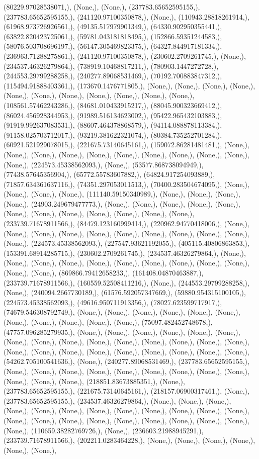 \documentclass{article}
\begin{document}
(80229.97028538071,), (None,), (None,), (237783.65652595155,), (237783.65652595155,), (241120.97100350878,), (None,), (110943.28818261914,), (61968.973726926561,), (49135.517979901349,), (64330.902950355441,), (63822.820423725061,), (59781.043181818495,), (152866.59351244583,), (58076.503708696197,), (56147.305469823375,), (64327.844917181334,), (236963.71288275861,), (241120.97100350878,), (230602.2709261745,), (None,), (234537.46326279864,), (738919.10468817211,), (780903.1447272728,), (244553.29799288258,), (240277.89068531469,), (70192.700883847312,), (115494.91888403361,), (173670.1476771805,), (None,), (None,), (None,), (None,), (None,), (None,), (None,), (None,), (None,), (None,), (None,), (108561.57462243286,), (84681.010433915217,), (88045.900323669412,), (86024.456928344953,), (91989.516134623002,), (95422.965432103883,), (91919.992637083531,), (88607.464378868579,), (94114.088878113384,), (91158.025703712017,), (93219.381622321074,), (80384.735252701284,), (60921.521929078015,), (221675.73140645161,), (159072.86281481481,), (None,), (None,), (None,), (None,), (None,), (None,), (None,), (None,), (None,), (None,), (None,), (224573.45338562093,), (None,), (53577.868738094949,), (77438.57645356904,), (65772.55783607882,), (64824.917254093889,), (71857.634361637116,), (74351.297053011513,), (70400.283504674095,), (None,), (None,), (None,), (None,), (111140.59150340989,), (None,), (None,), (None,), (None,), (24903.249679477773,), (None,), (None,), (None,), (None,), (None,), (None,), (None,), (None,), (None,), (None,), (None,), (None,), (233739.71678911566,), (84479.123160999414,), (220962.94770418006,), (None,), (None,), (None,), (None,), (None,), (None,), (None,), (None,), (None,), (None,), (None,), (224573.45338562093,), (227547.93621192055,), (405115.40806863853,), (153391.68914285715,), (230602.2709261745,), (234537.46326279864,), (None,), (None,), (None,), (None,), (None,), (None,), (None,), (None,), (None,), (None,), (None,), (None,), (869866.79412658233,), (161408.04870463887,), (233739.71678911566,), (160559.52508411216,), (None,), (244553.29799288258,), (None,), (240094.2667730189,), (61576.592057347669,), (59880.954315100105,), (224573.45338562093,), (49616.950711913356,), (78027.623599717917,), (74679.546308792749,), (None,), (None,), (None,), (None,), (None,), (None,), (None,), (None,), (None,), (None,), (None,), (75097.482452748678,), (47757.096285279935,), (None,), (None,), (None,), (None,), (None,), (None,), (None,), (None,), (None,), (None,), (None,), (None,), (None,), (None,), (None,), (None,), (None,), (None,), (None,), (None,), (None,), (None,), (None,), (None,), (54262.705100541636,), (None,), (240277.89068531469,), (237783.65652595155,), (None,), (None,), (None,), (None,), (None,), (None,), (None,), (None,), (None,), (None,), (None,), (None,), (218851.83673885351,), (None,), (237783.65652595155,), (221675.73140645161,), (218157.06900317461,), (None,), (237783.65652595155,), (234537.46326279864,), (None,), (None,), (None,), (None,), (None,), (None,), (None,), (None,), (None,), (None,), (None,), (None,), (None,), (None,), (None,), (None,), (None,), (None,), (None,), (None,), (None,), (None,), (110659.38282769726,), (None,), (236603.21988945291,), (233739.71678911566,), (202211.0283464228,), (None,), (None,), (None,), (None,), (None,), (None,), 
\end{document}
